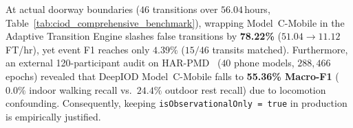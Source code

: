 At actual doorway boundaries ($46$ transitions over $56.04$\,hours, Table~\ref{tab:ciod_comprehensive_benchmark}), wrapping Model~C-Mobile in the Adaptive Transition Engine slashes false transitions by \textbf{78.22\%} ($51.04 \to 11.12$\,FT/hr), yet event F1 reaches only $4.39\%$ ($15/46$ transits matched). Furthermore, an external 120-participant audit on HAR-PMD~\cite{harpmd2025dataset} ($40$ phone models, $288{,}466$ epochs) revealed that DeepIOD Model~C-Mobile falls to \textbf{55.36\% Macro-F1} ($0.0\%$ indoor walking recall vs.\ $24.4\%$ outdoor rest recall) due to locomotion confounding. Consequently, keeping \texttt{isObservationalOnly = true} in production is empirically justified.

\begin{table}[htbp]
\centering
\caption{Session-Isolated Held-Out IOD Benchmark on Cambridge CIOD (Sessions~72--84, $N = 201{,}731$ Epochs).}
\label{tab:ciod_ios_benchmark}
\end{table}


